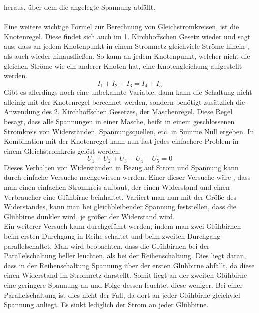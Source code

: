 heraus, über dem die angelegte Spannung abfällt. \autocite{Weigerber.2018}
\\\\
Eine weitere wichtige Formel zur Berechnung von Gleichstromkreisen, ist die Knotenregel. Diese findet sich auch im 1. Kirchhoffschen Gesetz wieder und sagt 
aus, dass an jedem Knotenpunkt in einem Stromnetz gleichviele Ströme hinein-, als auch wieder hinausfließen. So kann an jedem Knotenpunkt, welcher nicht 
die gleichen Ströme wie ein anderer Knoten hat, eine Knotengleichung aufgestellt werden. 
\begin{equation}
I_1+I_2+I_3=I_4+I_5
\label{eqn:1. Kirchhoffsches Gesetz}
\end{equation}
Gibt es allerdings noch eine unbekannte Variable, dann kann die Schaltung nicht alleinig mit der Knotenregel berechnet werden, sondern benötigt zusätzlich die 
Anwendung des 2. Kirchhoffschen Gesetzes, der Maschenregel. Diese Regel besagt, dass alle Spannungen in einer Masche, heißt in einem geschlossenen Stromkreis 
von Widerständen, Spannungsquellen, etc. in Summe Null ergeben. In Kombination mit der Knotenregel kann nun fast jedes einfachere Problem in einem 
Gleichstromkreis gelöst werden.
\begin{equation}
U_1+U_2+U_3-U_4-U_5=0
\label{eqn:2. Kirchhoffsches Gesetz}
\end{equation}
Dieses Verhalten von Widerständen in Bezug auf Strom und Spannung kann durch einfache Versuche nachgewiesen werden. Einer dieser Versuche wäre \zB, dass 
man einen einfachen Stromkreis aufbaut, der einen Widerstand und einen Verbraucher \zB eine Glühbirne beinhaltet. Variiert man nun mit der Größe des 
Widerstandes, kann man bei gleichbleibender Spannung feststellen, dass die Glühbirne dunkler wird, je größer der Widerstand wird.\\ 
Ein weiterer Versuch kann durchgeführt werden, indem man zwei Glühbirnen beim ersten Durchgang in Reihe schaltet und beim zweiten Durchgang 
parallelschaltet. Man wird beobachten, dass die Glühbirnen bei der Parallelschaltung heller leuchten, als bei der Reihenschaltung. Dies liegt daran, 
dass in der Reihenschaltung Spannung über der ersten Glühbirne abfällt, da diese einen Widerstand im Stromnetz darstellt. Somit liegt an der zweiten 
Glühbirne eine geringere Spannung an und Folge dessen leuchtet diese weniger. Bei einer Parallelschaltung ist dies nicht der Fall, da dort an jeder 
Glühbirne gleichviel Spannung anliegt. Es sinkt lediglich der Strom an jeder Glühbirne. \autocite{Weigerber.2018}
\\\\ 
